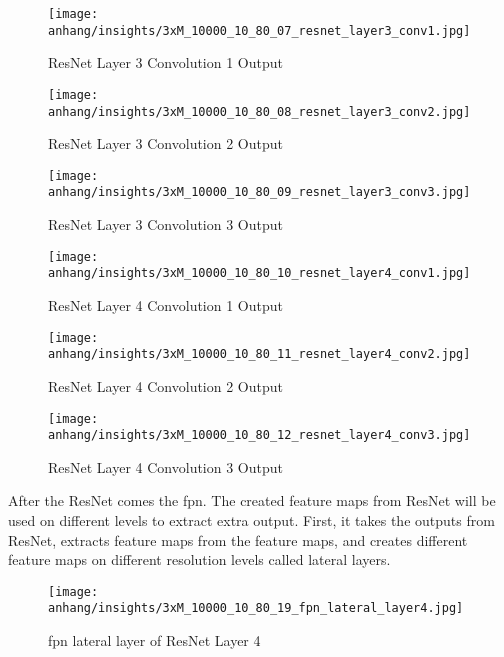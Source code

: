 	
	\begin{figure}[H]
		\centering
		\texttt{[image: anhang/insights/3xM\_10000\_10\_80\_07\_resnet\_layer3\_conv1.jpg]}
		\caption[ResNet Layer 3 Convolution 1 Output]{ResNet Layer 3 Convolution 1 Output}
	\end{figure}
	\begin{figure}[H]
		\centering
		\texttt{[image: anhang/insights/3xM\_10000\_10\_80\_08\_resnet\_layer3\_conv2.jpg]}
		\caption[ResNet Layer 3 Convolution 2 Output]{ResNet Layer 3 Convolution 2 Output}
	\end{figure}
	\begin{figure}[H]
		\centering
		\texttt{[image: anhang/insights/3xM\_10000\_10\_80\_09\_resnet\_layer3\_conv3.jpg]}
		\caption[ResNet Layer 3 Convolution 3 Output]{ResNet Layer 3 Convolution 3 Output}
	\end{figure}
	
	\begin{figure}[H]
		\centering
		\texttt{[image: anhang/insights/3xM\_10000\_10\_80\_10\_resnet\_layer4\_conv1.jpg]}
		\caption[ResNet Layer 4 Convolution 1 Output]{ResNet Layer 4 Convolution 1 Output}
	\end{figure}
	\begin{figure}[H]
		\centering
		\texttt{[image: anhang/insights/3xM\_10000\_10\_80\_11\_resnet\_layer4\_conv2.jpg]}
		\caption[ResNet Layer 4 Convolution 2 Output]{ResNet Layer 4 Convolution 2 Output}
	\end{figure}
	\begin{figure}[H]
		\centering
		\texttt{[image: anhang/insights/3xM\_10000\_10\_80\_12\_resnet\_layer4\_conv3.jpg]}
		\caption[ResNet Layer 4 Convolution 3 Output]{ResNet Layer 4 Convolution 3 Output}
	\end{figure}
	
	
	\FloatBarrier
	\clearpage
	
	After the ResNet comes the \ac{fpn}. The created feature maps from ResNet will be used on different levels to extract extra output. First, it takes the outputs from ResNet, extracts feature maps from the feature maps, and creates different feature maps on different resolution levels called lateral layers.
	
	\begin{figure}[H]
		\centering
		\texttt{[image: anhang/insights/3xM\_10000\_10\_80\_19\_fpn\_lateral\_layer4.jpg]}
		\caption[\ac{fpn} lateral layer of ResNet Layer 4]{\ac{fpn} lateral layer of ResNet Layer 4}
	\end{figure}
	
